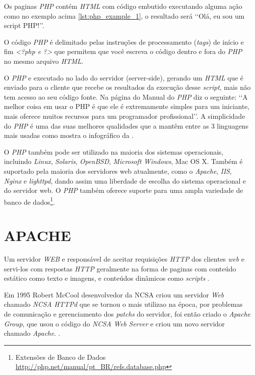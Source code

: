 Os paginas \textit{PHP} contém \textit{HTML} com código embutido executando alguma ação como no exemplo acima \ref{lst:php_example_1}, o resultado será \lq\lq Olá, eu sou um script PHP!\rq\rq.

O código \textit{PHP} é delimitado pelas instruções de processamento (\textit{tags}) de início e fim \textit{<?php e ?>} que permitem que você escreva o código dentro e fora do \textit{PHP} no mesmo arquivo \textit{HTML}. \cite{php-intro}

O \textit{PHP} e executado no lado do servidor (server-side), gerando um \textit{HTML} que é enviado para o cliente que recebe os resultados da execução desse \textit{script}, mais não tem acesso ao seu código fonte. Na página do Manual do \textit{PHP} diz o seguinte: \lq\lq A melhor coisa em usar o PHP é que ele é extremamente simples para um iniciante, mais oferece muitos recursos para um programador profissional\rq\rq {}. A simplicidade do \textit{PHP} é uma das suas melhores qualidades que a mantêm entre as 3 linguagens mais usadas como mostra o infográfico da .

O \textit{PHP} também pode ser utilizado na maioria dos sistemas operacionais, incluindo \textit{Linux}, \textit{Solaris}, \textit{OpenBSD}, \textit{Microsoft Windows}, Mac OS X. Também é suportado pela maioria dos servidores web atualmente, como o \textit{Apache}, \textit{IIS}, \textit{Nginx} e \textit{lighttpd}, dando assim uma liberdade de escolha do sistema operacional e do servidor web. O \textit{PHP} também oferece suporte para uma ampla variedade de banco de dados\footnote{Extensões de Banco de Dados \url{http://php.net/manual/pt_BR/refs.database.php}}.


\section{APACHE}
\label{sec:apache}

Um servidor \textit{WEB} e responsável de aceitar requisições \textit{HTTP} dos clientes \textit{web} e servi-los com respostas \textit{HTTP} geralmente na forma de paginas com conteúdo estático como texto e imagens, e conteúdos dinâmicos como \textit{scripts} \cite[p.~15]{igor}.

Em 1995 Robert McCool desenvolvedor da \ac{NCSA} criou um servidor \textit{Web} chamado \textit{NCSA HTTPd} que se tornou o mais utilizao na época, por problemas de comunicação e gerenciamento dos \textit{patchs} do servidor, foi então criado o \textit{Apache Group}, que usou o código do \textit{NCSA Web Server} e criou um novo servidor chamado \textit{Apache}. \cite[p.~36]{kabir}.

